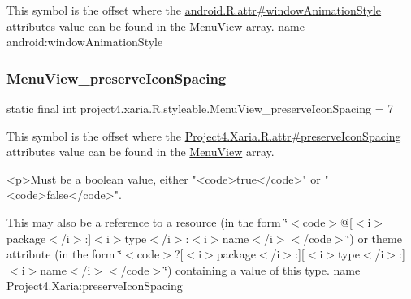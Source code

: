 This symbol is the offset where the \hyperlink{}{android.\+R.\+attr\#window\+Animation\+Style} attribute\textquotesingle{}s value can be found in the \hyperlink{classproject4_1_1xaria_1_1R_1_1styleable_ac1aef922f3c93d63048c893762b0dbda}{Menu\+View} array.  name android\+:window\+Animation\+Style \mbox{\label{classproject4_1_1xaria_1_1R_1_1styleable_a49472a6360fcdd0f2b8713f71f079e51}} 
\subsubsection{\texorpdfstring{Menu\+View\+\_\+preserve\+Icon\+Spacing}{MenuView\_preserveIconSpacing}}
{\footnotesize\ttfamily static final int project4.\+xaria.\+R.\+styleable.\+Menu\+View\+\_\+preserve\+Icon\+Spacing = 7\hspace{0.3cm}{\ttfamily [static]}}

This symbol is the offset where the \hyperlink{}{Project4.\+Xaria.\+R.\+attr\#preserve\+Icon\+Spacing} attribute\textquotesingle{}s value can be found in the \hyperlink{classproject4_1_1xaria_1_1R_1_1styleable_ac1aef922f3c93d63048c893762b0dbda}{Menu\+View} array.

\begin{DoxyVerb}      <p>Must be a boolean value, either "<code>true</code>" or "<code>false</code>".
\end{DoxyVerb}
 

This may also be a reference to a resource (in the form \char`\"{}$<$code$>$@\mbox{[}$<$i$>$package$<$/i$>$\+:\mbox{]}$<$i$>$type$<$/i$>$\+:$<$i$>$name$<$/i$>$$<$/code$>$\char`\"{}) or theme attribute (in the form \char`\"{}$<$code$>$?\mbox{[}$<$i$>$package$<$/i$>$\+:\mbox{]}\mbox{[}$<$i$>$type$<$/i$>$\+:\mbox{]}$<$i$>$name$<$/i$>$$<$/code$>$\char`\"{}) containing a value of this type.  name Project4.\+Xaria\+:preserve\+Icon\+Spacing \mbox{\label{classproject4_1_1xaria_1_1R_1_1styleable_a93b7138d1a19f728c4d3933a75ce23e2}} 
